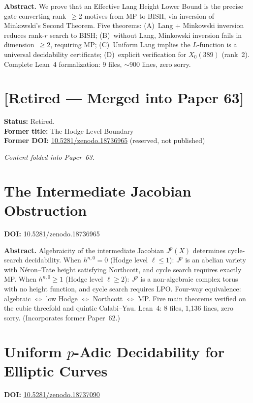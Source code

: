\documentclass[11pt,a4paper]{article}
\begin{document}
\bigskip
\noindent\textbf{Abstract.}
We prove that an Effective Lang Height Lower Bound is the precise gate converting rank~$\ge2$ motives from MP to BISH, via inversion of Minkowski's Second Theorem. Five theorems: (A)~Lang + Minkowski inversion reduces rank-$r$ search to BISH; (B)~without Lang, Minkowski inversion fails in dimension~$\ge2$, requiring MP; (C)~Uniform Lang implies the $L$-function is a universal decidability certificate; (D)~explicit verification for $X_0(389)$ (rank~2). Complete Lean~4 formalization: 9 files, $\sim$900 lines, zero sorry.

\section{[Retired --- Merged into Paper 63]}
\label{sec:p62}
\textbf{Status:} Retired.\\
\textbf{Former title:} The Hodge Level Boundary\\
\textbf{Former DOI:} \href{https://doi.org/10.5281/zenodo.18736965}{10.5281/zenodo.18736965} (reserved, not published)

\bigskip
\noindent\textit{Content folded into Paper~63.}

\section{The Intermediate Jacobian Obstruction}
\label{sec:p63}
\textbf{DOI:} 10.5281/zenodo.18736965

\bigskip
\noindent\textbf{Abstract.}
Algebraicity of the intermediate Jacobian $J^p(X)$ determines cycle-search decidability. When $h^{n,0}=0$ (Hodge level $\ell\le1$): $J^p$ is an abelian variety with N\'eron--Tate height satisfying Northcott, and cycle search requires exactly MP. When $h^{n,0}\ge1$ (Hodge level $\ell\ge2$): $J^p$ is a non-algebraic complex torus with no height function, and cycle search requires LPO. Four-way equivalence: algebraic $\iff$ low Hodge $\iff$ Northcott $\iff$ MP. Five main theorems verified on the cubic threefold and quintic Calabi--Yau. Lean~4: 8 files, 1,136 lines, zero sorry. (Incorporates former Paper~62.)

\section{Uniform $p$-Adic Decidability for Elliptic Curves}
\label{sec:p64}
\textbf{DOI:} \href{https://doi.org/10.5281/zenodo.18737090}{10.5281/zenodo.18737090}
\end{document}
